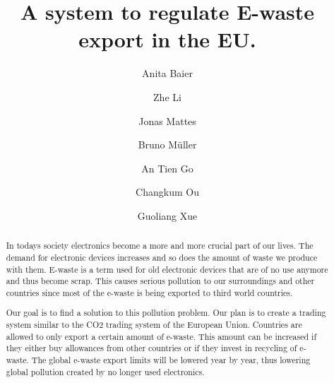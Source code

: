 \documentclass[sigchi-a, authorversion]{acmart}
\begin{document}
\title{A system to regulate E-waste export in the EU.}

\author{Anita Baier}

\author{Zhe Li}

\author{Jonas Mattes}

\author{Bruno M\"uller}

\author{An Tien Go}

\author{Changkum Ou}

\author{Guoliang Xue}



\begin{abstract}

  In todays society electronics become a more and more crucial part of our lives. 
  The demand for electronic devices increases and so does the amount of waste we produce with them. 
  E-waste is a term used for old electronic devices that are of no use anymore and thus become scrap. 
  This causes serious pollution to our surroundings and other countries since most of the e-waste is 
  being exported to third world countries.
  
  Our goal is to find a solution to this pollution problem. Our plan is to create a trading system similar 
  to the CO2 trading system of the European Union. Countries are allowed to only export a certain amount of e-waste. 
  This amount can be increased if they either buy allowances from other countries or if they invest in recycling of e-waste. 
  The global e-waste export limits will be lowered year by year, thus lowering global pollution created by no longer
  used electronics.  
  
\end{abstract}
\end{document}
